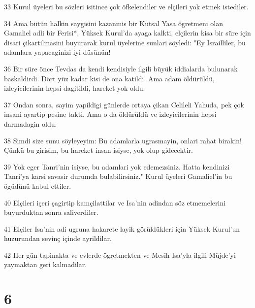 \par 33 Kurul üyeleri bu sözleri isitince çok öfkelendiler ve elçileri yok etmek istediler.
\par 34 Ama bütün halkin saygisini kazanmis bir Kutsal Yasa ögretmeni olan Gamaliel adli bir Ferisi*, Yüksek Kurul'da ayaga kalkti, elçilerin kisa bir süre için disari çikartilmasini buyurarak kurul üyelerine sunlari söyledi: "Ey Israilliler, bu adamlara yapacaginizi iyi düsünün!
\par 36 Bir süre önce Tevdas da kendi kendisiyle ilgili büyük iddialarda bulunarak baskaldirdi. Dört yüz kadar kisi de ona katildi. Ama adam öldürüldü, izleyicilerinin hepsi dagitildi, hareket yok oldu.
\par 37 Ondan sonra, sayim yapildigi günlerde ortaya çikan Celileli Yahuda, pek çok insani ayartip pesine takti. Ama o da öldürüldü ve izleyicilerinin hepsi darmadagin oldu.
\par 38 Simdi size sunu söyleyeyim: Bu adamlarla ugrasmayin, onlari rahat birakin! Çünkü bu girisim, bu hareket insan isiyse, yok olup gidecektir.
\par 39 Yok eger Tanri'nin isiyse, bu adamlari yok edemezsiniz. Hatta kendinizi Tanri'ya karsi savasir durumda bulabilirsiniz." Kurul üyeleri Gamaliel'in bu ögüdünü kabul ettiler.
\par 40 Elçileri içeri çagirtip kamçilattilar ve Isa'nin adindan söz etmemelerini buyurduktan sonra saliverdiler.
\par 41 Elçiler Isa'nin adi ugruna hakarete layik görüldükleri için Yüksek Kurul'un huzurundan sevinç içinde ayrildilar.
\par 42 Her gün tapinakta ve evlerde ögretmekten ve Mesih Isa'yla ilgili Müjde'yi yaymaktan geri kalmadilar.

\chapter{6}

